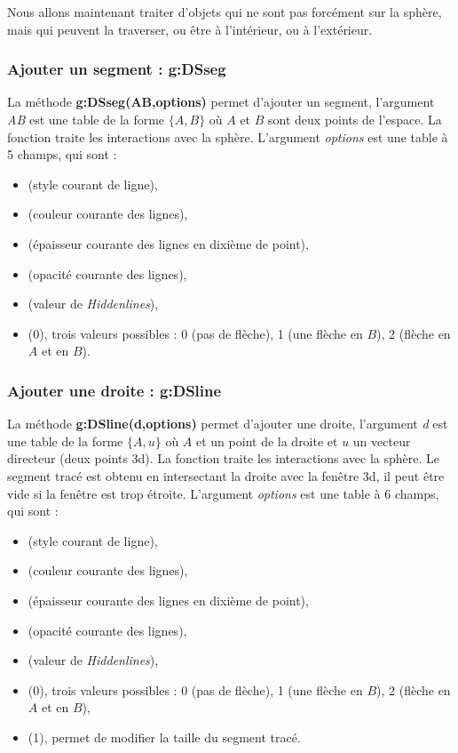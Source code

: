 Nous allons maintenant traiter d'objets qui ne sont pas forcément sur la sphère, mais qui peuvent la traverser, ou être à l'intérieur, ou à l'extérieur.

\subsubsection{ Ajouter un segment : g:DSseg}

La méthode \textbf{g:DSseg(AB,options)} permet d'ajouter un segment, l'argument \emph{AB} est une table de la forme $\{A,B\}$ où $A$ et $B$ sont deux points de l'espace. La fonction traite les interactions avec la sphère. L'argument \emph{options} est une table à 5 champs, qui sont :
    \begin{itemize}
        \item {} (style courant de ligne), 
        \item {} (couleur courante des lignes),
        \item {} (épaisseur courante des lignes en dixième de point),
        \item {} (opacité courante des lignes),
        \item {} (valeur de \emph{Hiddenlines}),
        \item {} (0), trois valeurs possibles : 0 (pas de flèche), 1 (une flèche en $B$), 2 (flèche en $A$ et en $B$).
    \end{itemize}
    
\subsubsection{ Ajouter une droite : g:DSline}

La méthode \textbf{g:DSline(d,options)} permet d'ajouter une droite, l'argument \emph{d} est une table de la forme $\{A,u\}$ où $A$ et un point de la droite et $u$ un vecteur directeur (deux points 3d). La fonction traite les interactions avec la sphère.  Le segment tracé est obtenu en intersectant la droite avec la fenêtre 3d, il peut être vide si la fenêtre est trop étroite. L'argument \emph{options} est une table à 6 champs, qui sont :
    \begin{itemize}
        \item {} (style courant de ligne), 
        \item {} (couleur courante des lignes),
        \item {} (épaisseur courante des lignes en dixième de point),
        \item {} (opacité courante des lignes),
        \item {} (valeur de \emph{Hiddenlines}),
        \item {} (0), trois valeurs possibles : 0 (pas de flèche), 1 (une flèche en $B$), 2 (flèche en $A$ et en $B$),
        \item {} (1), permet de modifier la taille du segment tracé.
    \end{itemize}
    
